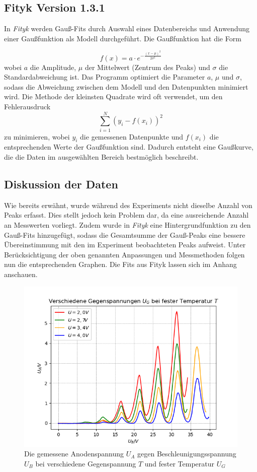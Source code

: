 \documentclass{article}
\begin{document}
\begin{multicols}{2}
\subsection*{Fityk Version 1.3.1}
In \textit{Fityk} werden Gauß-Fits durch Auswahl eines Datenbereichs und Anwendung einer Gaußfunktion als 
Modell durchgeführt. Die Gaußfunktion hat die Form 

\begin{equation*}
f(x) = a \cdot e^{-\frac{(x - \mu)^2}{2 \sigma^2}}
\end{equation*}
wobei $a$ die Amplitude, $\mu$ der Mittelwert (Zentrum des Peaks) und $\sigma$ die Standardabweichung 
ist. Das Programm optimiert die Parameter $a$, $\mu$ und $\sigma$, sodass die Abweichung zwischen dem Modell 
und den Datenpunkten minimiert wird. Die Methode der kleinsten Quadrate wird oft verwendet, um den
 Fehlerausdruck
\begin{equation*}
\sum_{i=1}^{N} (y_i - f(x_i))^2
\end{equation*}
zu minimieren, wobei $y_i$ die gemessenen Datenpunkte und $f(x_i)$ die entsprechenden Werte der Gaußfunktion 
sind. Dadurch entsteht eine Gaußkurve, die die Daten im ausgewählten Bereich bestmöglich beschreibt.
\subsection*{Diskussion der Daten}
 Wie bereits erwähnt, wurde während des Experiments nicht dieselbe Anzahl von Peaks erfasst. Dies stellt jedoch 
 kein Problem dar, da eine ausreichende Anzahl an Messwerten vorliegt. Zudem wurde in \textit{Fityk} eine 
 Hintergrundfunktion zu den Gauß-Fits hinzugefügt, sodass die Gesamtsumme der Gauß-Peaks eine bessere 
 Übereinstimmung mit den im Experiment beobachteten Peaks aufweist. Unter Berücksichtigung der oben genannten Anpassungen 
 und Messmethoden folgen nun die entsprechenden Graphen. Die Fits aus Fityk lassen sich im Anhang anschauen. 
\begin{figure}[H]
  \centering
  \includegraphics[scale=0.55]{FH_vieleT.png}
  \caption{Die gemessene  Anodenspannung $U_A$ gegen Beschleunigungsspannung $U_B$ bei
   verschiedene Gegenspannung $T$ und fester Temperatur $U_G$}
\end{figure}


\end{multicols}
\end{document}
